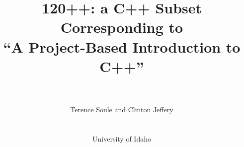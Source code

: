 \documentclass[11pt,openany]{book}
\title{120++: a C++ Subset Corresponding to\\
``A Project-Based Introduction to C++''}
\date{}
\author{\\ \\ Terence Soule and Clinton Jeffery\\ \\ \\University of Idaho}
\begin{document}
\maketitle

\frontmatter

\tableofcontents

\newcommand{\codefont}[1]{\texttt{#1}}
\newcommand{\cf}[1]{\texttt{#1}}


\newif\ifcolor
\colortrue
\newcommand{\mycolor}{Mahogany}


\newcommand{\mysubsubsection}[1]{\vspace{-0.25cm}\subsubsection{#1}\vspace{-0.25cm}}

\newcommand{\mysubsection}[1]{\vspace{-0.25cm}\subsection{#1}\vspace{-0.25cm}}

\newcommand{\modification}[1]{\vspace{0.25cm}
{\noindent{\large\textbf{Mod \arabic{chapter}.\arabic{modNumber}: #1\\}}}}


\newcommand{\interlude}[1]{\newpage{\noindent{\LARGE\textbf{Interlude \arabic{interlude}: #1}}}
\addcontentsline{toc}{chapter}{Interlude \arabic{interlude}:  #1}\\\\}


\newenvironment{tight_itemize}{
\vspace{-0.2cm}
\begin{itemize} 
\setlength{\itemsep}{2pt} 
\setlength{\parskip}{0pt} 
\setlength{\parsep}{0pt} 
}{\end{itemize}}

\newenvironment{tight_enumerate}{
\vspace{-0.25cm}
\begin{enumerate} 
\setlength{\itemsep}{2pt} 
\setlength{\parskip}{0pt} 
\setlength{\parsep}{0pt} 
}{\end{enumerate}}
\end{document}
